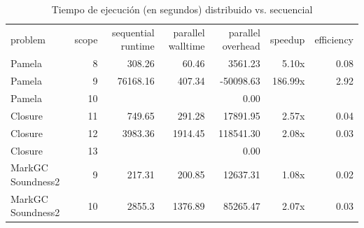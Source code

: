 \begin{table}[h]\tiny
	\begin{tabular}{lrrrrrr}
		\toprule
		problem	&	scope	&	sequential runtime	&	parallel walltime	&	parallel overhead	&	speedup	&	efficiency \\
		\cmidrule(r){1-7}
		Pamela	&	8	&	308.26	&	60.46	&	3561.23	&	5.10x	&	0.08 \\
		Pamela	&	9	&	76168.16	&	407.34	&	-50098.63	&	186.99x	&	2.92 \\
		Pamela	&	10	&		&		&	0.00	&		&	 \\
		\cmidrule(r){1-7}
		Closure	&	11	&	749.65	&	291.28	&	17891.95	&	2.57x	&	0.04 \\
		Closure	&	12	&	3983.36	&	1914.45	&	118541.30	&	2.08x	&	0.03 \\
		Closure	&	13	&		&		&	0.00	&		&	 \\
		\cmidrule(r){1-7}
		MarkGC Soundness2	&	9	&	217.31	&	200.85	&	12637.31	&	1.08x	&	0.02 \\
		MarkGC Soundness2	&	10	&	2855.3	&	1376.89	&	85265.47	&	2.07x	&	0.03 \\
		\bottomrule
	\end{tabular}
	\caption{Tiempo de ejecución (en segundos) distribuido vs. secuencial}
\end{table}